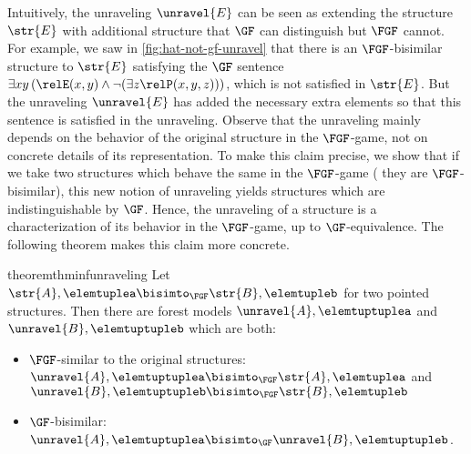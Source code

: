 Intuitively, the unraveling $\unravel{E}$ can be seen as extending the structure $\str{E}$ with additional structure that $\GF$ can distinguish but $\FGF$ cannot.
For example, we saw in \cref{fig:hat-not-gf-unravel} that there is an $\FGF$-bisimilar structure to $\str{E}$ satisfying the $\GF$ sentence $\exists{xy}\,(\relE(x,y) \land \lnot (\exists z \relP(x,y,z)))$, which is not satisfied in $\str{E}$.
But the unraveling $\unravel{E}$ has added the necessary extra elements so that this sentence is satisfied in the unraveling.
Observe that the unraveling mainly depends on the behavior of the original structure in the $\FGF$-game, not on concrete details of its representation.
To make this claim precise, we show that if we take two structures which behave the same in the $\FGF$-game (\ie{} they are $\FGF$-bisimilar), this new notion of unraveling yields structures which are indistinguishable by $\GF$.
Hence, the unraveling of a structure is a characterization of its behavior in the $\FGF$-game, up to $\GF$-equivalence. The following theorem makes this claim more concrete.
\begin{restatable}{theorem}{thminfunraveling}\label{thm:inf-unraveling-upgrading}
  Let $\str{A}, \elemtuplea \bisimto_{\FGF} \str{B}, \elemtupleb$ for two pointed structures.
  Then there are forest models $\unravel{A}, \elemtuptuplea$ and $\unravel{B}, \elemtuptupleb$ which are both:
  \begin{itemize}
    \item $\FGF$-similar to the original structures: $\unravel{A}, \elemtuptuplea \bisimto_{\FGF} \str{A}, \elemtuplea$ and $\unravel{B}, \elemtuptupleb \bisimto_{\FGF} \str{B}, \elemtupleb$
    \item $\GF$-bisimilar: $\unravel{A}, \elemtuptuplea \bisimto_{\GF} \unravel{B}, \elemtuptupleb$.
  \end{itemize}
\end{restatable}
